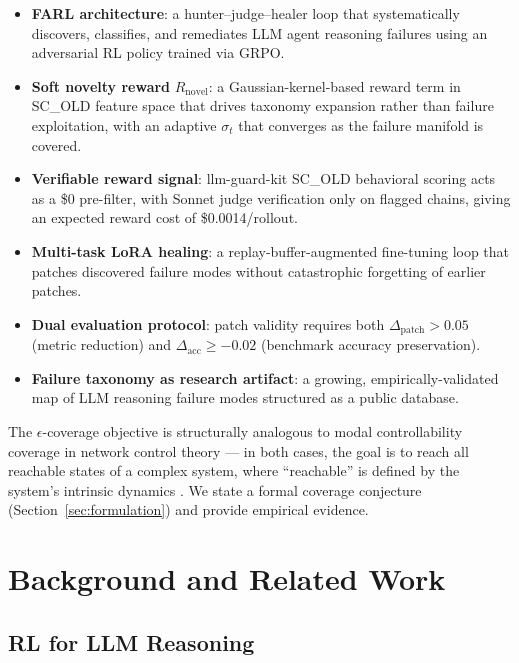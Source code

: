 \documentclass[11pt,a4paper]{article}
\begin{document}
\begin{itemize}
  \item \textbf{FARL architecture}: a hunter--judge--healer loop that
        systematically discovers, classifies, and remediates LLM agent reasoning
        failures using an adversarial RL policy trained via GRPO.
  \item \textbf{Soft novelty reward} $R_\text{novel}$: a Gaussian-kernel-based
        reward term in SC\_OLD feature space that drives taxonomy expansion rather
        than failure exploitation, with an adaptive $\sigma_t$ that converges as
        the failure manifold is covered.
  \item \textbf{Verifiable reward signal}: llm-guard-kit SC\_OLD behavioral
        scoring acts as a \$0 pre-filter, with Sonnet judge verification only
        on flagged chains, giving an expected reward cost of \$0.0014/rollout.
  \item \textbf{Multi-task LoRA healing}: a replay-buffer-augmented fine-tuning
        loop that patches discovered failure modes without catastrophic forgetting
        of earlier patches.
  \item \textbf{Dual evaluation protocol}: patch validity requires both
        $\Delta_\text{patch} > 0.05$ (metric reduction) and
        $\Delta_\text{acc} \geq -0.02$ (benchmark accuracy preservation).
  \item \textbf{Failure taxonomy as research artifact}: a growing,
        empirically-validated map of LLM reasoning failure modes structured
        as a public database.
\end{itemize}

The $\epsilon$-coverage objective is structurally analogous to modal
controllability coverage in network control theory --- in both cases, the goal
is to reach all reachable states of a complex system, where ``reachable'' is
defined by the system's intrinsic dynamics \cite{liu2011controllability}.
We state a formal coverage conjecture (Section~\ref{sec:formulation}) and
provide empirical evidence.

\section{Background and Related Work}
\label{sec:background}

\subsection{RL for LLM Reasoning}
\end{document}
